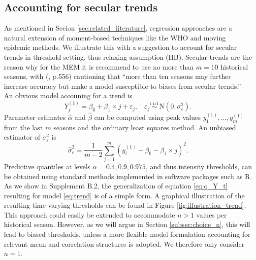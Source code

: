 \documentclass[12pt]{article}
\begin{document}
\subsection{Accounting for secular trends}
\label{subsec:regression}
\label{subsec:trends}

As mentioned in Secion \ref{sec:related_literature}, regression approaches are a natural extension of moment-based techniques like the WHO and moving epidemic methods. We illustrate this with a suggestion to account for secular trends in threshold setting, thus relaxing assumption (HB). Secular trends are the reason why for the MEM it is recommend to use no more than $m = 10$ historical seasons, with \citeauthor{Vega2013} (\citeyear{Vega2013}, p.556) cautioning that ``more than ten seasons may further increase accuracy but make a model susceptible to biases from secular trends.'' An obvious model accouning for a trend is
\begin{equation}
Y_j^{(1)} = \beta_0 + \beta_1 \times j + \varepsilon_j, \ \ \ \ \varepsilon_j \stackrel{\text{i.i.d.}}{\sim} \text{N}(0, \sigma^2_\varepsilon).\label{eq:trend}
\end{equation}
Parameter estimates $\hat{\alpha}$ and $\hat{\beta}$ can be computed using peak values $y_1^{(1)}, \dots, y_m^{(1)}$ from the last $m$ seasons and the ordinary least squares method. An unbiased estimator of ${\sigma}^2_\varepsilon$ is
$$
\hat{\sigma}^2_\varepsilon = \frac{1}{m - 2} \sum_{j = 1}^m (y^{(1)}_i - \beta_0 - \beta_1 \times j)^2.
$$
Predictive quantiles at levels $\alpha = 0.4, 0.9, 0.975$, and thus intensity thresholds, can be obtained using standard methods implemented in software packages such as R. As we show in Supplement B.2, the generalization of equation \eqref{eq:q_Y_t} resulting for model \eqref{eq:trend} is of a simple form. A graphical illustration of the resulting time-varying thresholds can be found in Figure \ref{fig:illustration_trend}. This approach could easily be extended to accommodate $n > 1$ values per historical season. However, as we will argue in Section \ref{subsec:choice_n}, this will lead to biased thresholds, unless a more flexible model formulation accounting for relevant mean and correlation structures is adopted. We therefore only consider $n = 1$.
\end{document}
